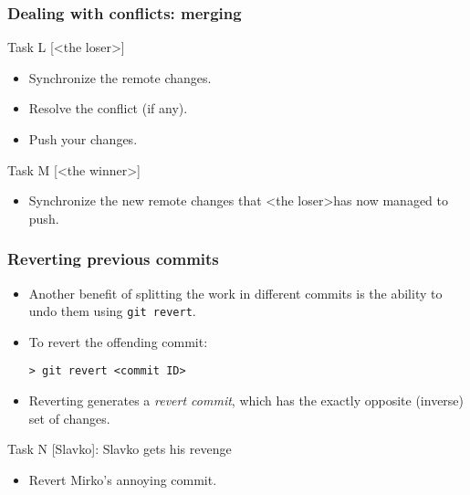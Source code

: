 
\begin{frame}[fragile]
	\frametitle{Dealing with conflicts: merging}

	
	\begin{block}{Task L [\textless the loser\textgreater]}
	\begin{itemize}
	\item Synchronize the remote changes.
	\item Resolve the conflict (if any).
	\item Push your changes.
	\end{itemize}
	\end{block}
	
	\begin{block}{Task M [\textless the winner\textgreater]}
	\begin{itemize}

	\item Synchronize the new remote changes that \textless the loser\textgreater has now managed to push.

	\end{itemize}
	\end{block}
	

\end{frame}





\begin{frame}[fragile]

\frametitle{Reverting previous commits}

	\begin{itemize}
	\item Another benefit of splitting the work in different commits is the ability to undo them using \texttt{git revert}.
	\item To revert the offending commit:
	\begin{verbatim}
> git revert <commit ID>
	\end{verbatim}
	\item Reverting generates a \textit{revert commit}, which has the exactly opposite (inverse) set of changes.
	\end{itemize}

	\begin{block}{Task N [Slavko]: Slavko gets his revenge}
	\begin{itemize}
	\item Revert Mirko's annoying commit.

	\end{itemize}
	\end{block}
	
\end{frame}


